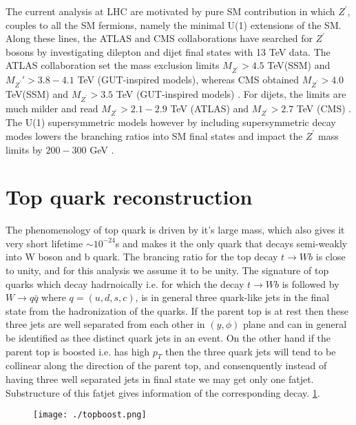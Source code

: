 \documentclass[12pt,a4paper]{article}		%
\begin{document}
The current analysis at LHC are motivated by pure SM contribution in which $Z^\prime$, couples to all the SM fermions, namely the minimal U(1) extensions of the SM. Along these lines, the ATLAS and CMS collaborations have searched for $Z^\prime$ bosons by investigating dilepton and dijet final states with 13 TeV data. The ATLAS collaboration \cite{atlas} set the mass exclusion limits $M_{Z^\prime}>4.5$ TeV(SSM) and $M_{Z^\prime}′>3.8-4.1 $ TeV (GUT-inspired models), whereas CMS obtained $M_{Z^\prime}>4.0 $ TeV(SSM) and $M_{Z^\prime}>3.5$ TeV (GUT-inspired models) \cite{cms}.  For dijets,  the limits are much milder and read $M_{Z^\prime} > 2.1-2.9$ TeV (ATLAS) \cite{atlasjet} and $M_{Z^\prime} >2.7$ TeV (CMS) \cite{cmsjet}. The U(1) supersymmetric models however by including supersymmetric decay modes lowers the branching ratios into SM final states and impact the $Z^\prime$ mass limits by $200-300$ GeV \cite{zsusy}. 
   

\newpage

\section{Top quark reconstruction}

The phenomenology of top quark is driven by it's large mass, which also gives it very short lifetime $\sim 10^{-24}$s and makes it the only quark that decays semi-weakly into W boson and b quark. The brancing ratio for the top decay $t \to W b $ is close to unity, and for this analysis we assume it to be unity. The signature of top quarks which decay hadrnoically i.e. for which the decay $t \to W b $ is followed by $W \to q \bar{q}$ where $q = (u, d, s, c)$, is in general three quark-like jets in the final state from the hadronization of the quarks. If the parent top is at rest then these three jets are well separated from each other in $(y,\phi)$ plane and can in general be identified as thee distinct quark jets in an event. On the other hand if the parent top is boosted i.e. has high $p_T$ then the three quark jets will tend to be collinear along the direction of the parent top, and consenquently instead of having three well separated jets in final state we may get only one  fatjet. Substructure of this fatjet gives information of the corresponding decay. \ref{boost}.     

 	\begin{figure}[h]
 		\begin{centering}	
 			\texttt{[image: ./topboost.png]} 
 			\caption{}
 			\label{boost}
 			\centering
 		\end{centering} 		
 	\end{figure}   
\end{document}
